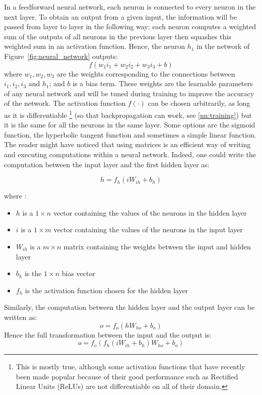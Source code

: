 In a feedforward neural network, each neuron is connected to every neuron in 
the next layer.  To obtain an output from a given input,
the information will be passed from layer to layer in the following way: 
each neuron computes a weighted sum of the outputs of all neurons in the
previous layer then squashes this weighted sum in an activation function.
Hence, the neuron $h_1$ in the network of Figure~\ref{fig:neural_network}
outputs:
$$ f(w_1i_1 + w_2i_2 + w_3i_3 + b) $$
where $w_1, w_2, w_3$ are the weights  corresponding to the
connections between $i_1, i_2, i_3$ and $h_1$; and $b$ is a bias term. 
These weights are the learnable parameters of any neural network and will be 
tuned during training to improve the accuracy of the network. 
The activation function $f(\cdot)$ can be chosen arbitrarily, as long as it 
is differentiable \footnote{This is mostly true, although some activation
functions that have recently been made popular because of their good
performance such as Rectified Linear Units (ReLUs) \cite{relus} are not 
differentiable on all of their domain.}
(so that backpropagation can work, see \ref{nn:training})
but it is the same for all the neurons in the same layer. Some options are
the sigmoid function, the hyperbolic tangent function and sometimes a simple
linear function.\\

The reader might have noticed that using matrices is an efficient way of writing
and executing computations within a neural network. Indeed, one could write
the computation between the input layer and the first hidden layer as: 

$$ h = f_h(iW_{ih} + b_h) $$

\noindent where : 
\begin{itemize}
	\item $h$ is a $1\times n$ vector containing the values of the neurons 
		in the hidden layer
	\item $i$ is a $1\times m$ vector containing the values of the neurons
		in the input layer
	\item $W_{ih}$ is a $m\times n$ matrix containing the weights between
		the input and hidden layer
	\item $b_h$ is the $1\times n$ bias vector 
	\item $f_h$ is the activation function chosen for the hidden layer
\end{itemize}

Similarly, the computation between the hidden layer and the output layer
can be written as:
$$ o = f_o(hW_{ho} + b_o) $$
Hence the full transformation between the input and the output is:
$$ o = f_o\left(f_h(iW_{ih} + b_h)W_{ho} + b_o\right) $$

